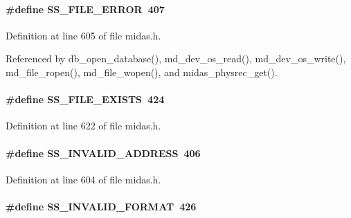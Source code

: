 \paragraph[{SS\_\-FILE\_\-ERROR}]{\setlength{\rightskip}{0pt plus 5cm}\#define SS\_\-FILE\_\-ERROR~407}\hfill\label{group__err24_ga25ab2ae4b1702824549b8e40a6e86718}

\begin{DoxyItemize}
\item 
\end{DoxyItemize}

Definition at line 605 of file midas.h.

Referenced by db\_\-open\_\-database(), md\_\-dev\_\-os\_\-read(), md\_\-dev\_\-os\_\-write(), md\_\-file\_\-ropen(), md\_\-file\_\-wopen(), and midas\_\-physrec\_\-get().
\paragraph[{SS\_\-FILE\_\-EXISTS}]{\setlength{\rightskip}{0pt plus 5cm}\#define SS\_\-FILE\_\-EXISTS~424}\hfill\label{group__err24_ga252be9bba4cc9d08025559dc495aca6b}

\begin{DoxyItemize}
\item 
\end{DoxyItemize}

Definition at line 622 of file midas.h.
\paragraph[{SS\_\-INVALID\_\-ADDRESS}]{\setlength{\rightskip}{0pt plus 5cm}\#define SS\_\-INVALID\_\-ADDRESS~406}\hfill\label{group__err24_ga8741bfc9d74c60db4d6978b337cfef93}

\begin{DoxyItemize}
\item 
\end{DoxyItemize}

Definition at line 604 of file midas.h.
\paragraph[{SS\_\-INVALID\_\-FORMAT}]{\setlength{\rightskip}{0pt plus 5cm}\#define SS\_\-INVALID\_\-FORMAT~426}\hfill\label{group__err24_gaa473d6d45ff06e93dcab855be5170ab1}

